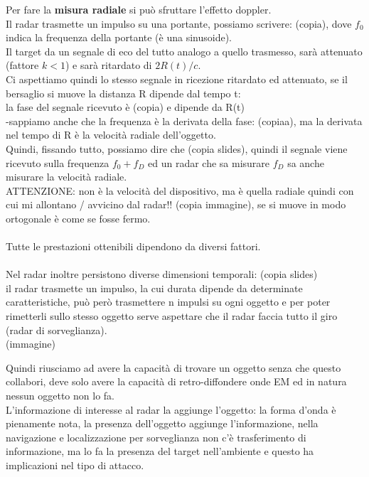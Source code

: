 \documentclass[oneside, 12pt]{extbook}
\begin{document}
Per fare la \textbf{misura radiale} si può sfruttare l'effetto doppler.\\
Il radar trasmette un impulso su una portante, possiamo scrivere: (copia), dove $f_0$ indica la frequenza della portante (è una sinusoide).\\
Il target da un segnale di eco del tutto analogo a quello trasmesso, sarà attenuato (fattore $k < 1$) e sarà ritardato di $2R(t)/c$.\\
Ci aspettiamo quindi lo stesso segnale in ricezione ritardato ed attenuato, se il bersaglio si muove la distanza R dipende dal tempo t:\\ la fase del segnale ricevuto è (copia) e dipende da R(t)\\-sappiamo anche che la frequenza è la derivata della fase: (copiaa), ma la derivata nel tempo di R è la velocità radiale dell'oggetto.\\Quindi, fissando tutto, possiamo dire che (copia slides), quindi il segnale viene ricevuto sulla frequenza $f_0 + f_D$ ed un radar che sa misurare $f_D$ sa anche misurare la velocità radiale.\\
ATTENZIONE: non è la velocità del dispositivo, ma è quella radiale quindi con cui mi allontano / avvicino dal radar!! (copia immagine), se si muove in modo ortogonale è come se fosse fermo.\\\\
Tutte le prestazioni ottenibili dipendono da diversi fattori.\\\\
Nel radar inoltre persistono diverse dimensioni temporali: (copia slides)\\
il radar trasmette un impulso, la cui durata dipende da determinate caratteristiche, può però trasmettere n impulsi su ogni oggetto e per poter rimetterli sullo stesso oggetto serve aspettare che il radar faccia tutto il giro (radar di sorveglianza).\\
(immagine)

Quindi riusciamo ad avere la capacità di trovare un oggetto senza che questo collabori, deve solo avere la capacità di retro-diffondere onde EM ed in natura nessun oggetto non lo fa.\\
L'informazione di interesse al radar la aggiunge l'oggetto: la forma d'onda è pienamente nota, la presenza dell'oggetto aggiunge l'informazione, nella navigazione e localizzazione per sorveglianza non c'è trasferimento di informazione, ma lo fa la presenza del target nell'ambiente e questo ha implicazioni nel tipo di attacco.\\
\end{document}
